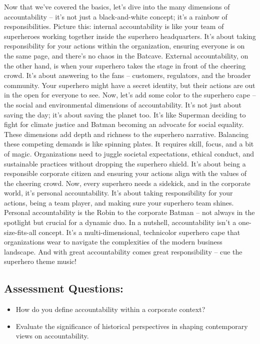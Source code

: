 \documentclass[
  letterpaper,
  DIV=11,
  numbers=noendperiod]{scrreprt}
\begin{document}
Now that we've covered the basics, let's dive into the many dimensions
of accountability -- it's not just a black-and-white concept; it's a
rainbow of responsibilities. Picture this: internal accountability is
like your team of superheroes working together inside the superhero
headquarters. It's about taking responsibility for your actions within
the organization, ensuring everyone is on the same page, and there's no
chaos in the Batcave. External accountability, on the other hand, is
when your superhero takes the stage in front of the cheering crowd. It's
about answering to the fans -- customers, regulators, and the broader
community. Your superhero might have a secret identity, but their
actions are out in the open for everyone to see. Now, let's add some
color to the superhero cape -- the social and environmental dimensions
of accountability. It's not just about saving the day; it's about saving
the planet too. It's like Superman deciding to fight for climate justice
and Batman becoming an advocate for social equality. These dimensions
add depth and richness to the superhero narrative. Balancing these
competing demands is like spinning plates. It requires skill, focus, and
a bit of magic. Organizations need to juggle societal expectations,
ethical conduct, and sustainable practices without dropping the
superhero shield. It's about being a responsible corporate citizen and
ensuring your actions align with the values of the cheering crowd. Now,
every superhero needs a sidekick, and in the corporate world, it's
personal accountability. It's about taking responsibility for your
actions, being a team player, and making sure your superhero team
shines. Personal accountability is the Robin to the corporate Batman --
not always in the spotlight but crucial for a dynamic duo. In a
nutshell, accountability isn't a one-size-fits-all concept. It's a
multi-dimensional, technicolor superhero cape that organizations wear to
navigate the complexities of the modern business landscape. And with
great accountability comes great responsibility -- cue the superhero
theme music!

\subsection{Assessment Questions:}\label{assessment-questions-1}

\begin{itemize}
\item
  How do you define accountability within a corporate context?
\item
  Evaluate the significance of historical perspectives in shaping
  contemporary views on accountability.
\end{itemize}
\end{document}
